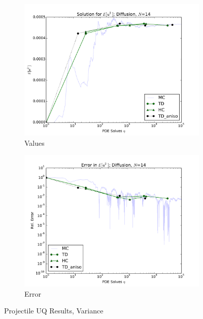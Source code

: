 \documentclass[11pt]{article}
\begin{document}
\begin{figure}[H]
    \centering
    \begin{subfigure}[b]{0.49 \textwidth}
      \includegraphics[width=\textwidth]{../graphics/N14_aniso_var_vals}
      \caption{Values}
      \label{atn vals hdmr}
  \end{subfigure}
\begin{subfigure}[b]{0.49 \textwidth}
\centering
      \includegraphics[width=\textwidth]{../graphics/N14_aniso_var_errs}
      \caption{Error}
      \label{atn errs hdmr}
    \end{subfigure}
  \caption{Projectile UQ Results, Variance}
  \label{diff14 anis variance}
  \end{figure}
\end{document}
